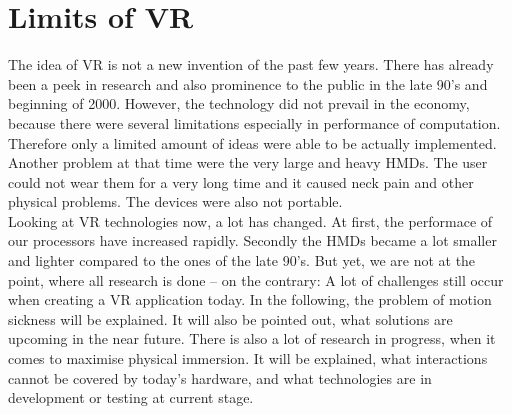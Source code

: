 \section{Limits of VR} \label{limits}
The idea of VR is not a new invention of the past few years. There has already been a peek in research and also prominence to the public in the late 90's and beginning of 2000. However, the technology did not prevail in the economy, because there were several limitations especially in performance of computation. Therefore only a limited amount of ideas were able to be actually implemented. Another problem at that time were the very large and heavy HMDs. The user could not wear them for a very long time and it caused neck pain and other physical problems. The devices were also not portable. \cite{Jerald.2016}\\
Looking at VR technologies now, a lot has changed. At first, the performace of our processors have increased rapidly. Secondly the HMDs became a lot smaller and lighter compared to the ones of the late 90's. But yet, we are not at the point, where all research is done -- on the contrary: A lot of challenges still occur when creating a VR application today. In the following, the problem of motion sickness will be explained. It will also be pointed out, what solutions are upcoming in the near future. There is also a lot of research in progress, when it comes to maximise physical immersion. It will be explained, what interactions cannot be covered by today's hardware, and what technologies are in development or testing at current stage.
